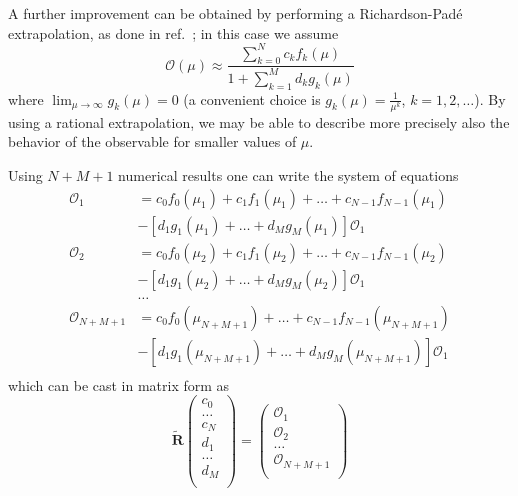 \documentclass[final]{article}
\begin{document}
A further improvement can be obtained by performing a Richardson-Pad\'e extrapolation, as done in ref.~\cite{Amore16}; 
in this case we  assume 
\begin{equation}
\mathcal{O}(\mu) \approx \frac{\sum_{k=0}^N c_k f_k(\mu)}{1+\sum_{k=1}^M d_k g_k(\mu)}
\end{equation}
where $\lim_{\mu \rightarrow \infty } g_k(\mu) =0$ (a convenient choice is $g_k(\mu) = \frac{1}{\mu^k}$, $k=1,2,\dots$).
By using a rational extrapolation, we may be able to describe more precisely also the behavior of the observable for smaller values of $\mu$. 


Using $N+M+1$ numerical results one can write the system of equations
\begin{equation}
\begin{split}
\mathcal{O}_1 &=  c_0 f_0(\mu_1) + c_1 f_1(\mu_1) + \dots  + c_{N-1} f_{N-1}(\mu_1) \\
&- \left[ d_1 g_1(\mu_1) + \dots + d_M g_M(\mu_1)\right] \mathcal{O}_1 \\
\mathcal{O}_2 &=  c_0 f_0(\mu_2) + c_1 f_1(\mu_2) + \dots  + c_{N-1} f_{N-1}(\mu_2) \\
&- \left[ d_1 g_1(\mu_2) + \dots + d_M g_M(\mu_2)\right] \mathcal{O}_1 \\
&\dots \\
\mathcal{O}_{N+M+1} &=  c_0 f_0(\mu_{N+M+1} ) + \dots  + c_{N-1} f_{N-1}(\mu_{N+M+1} ) \\
&- \left[ d_1 g_1(\mu_{N+M+1} ) + \dots + d_M g_M(\mu_{N+M+1} )\right] \mathcal{O}_1 \\
\end{split}
\end{equation}
which can be cast in matrix form as
\begin{equation}
\tilde{\mathbf{R}}  \left(
\begin{array}{c}
	c_0 \\
	\dots \\
	c_{N} \\
	d_1 \\
	\dots \\
	d_{M} \\
\end{array}
\right) = \left(
\begin{array}{c}
	\mathcal{O}_1  \\
	\mathcal{O}_2 \\
	\dots \\
	\mathcal{O}_{N+M+1}\\
\end{array}
\right) 
\end{equation}
\end{document}

